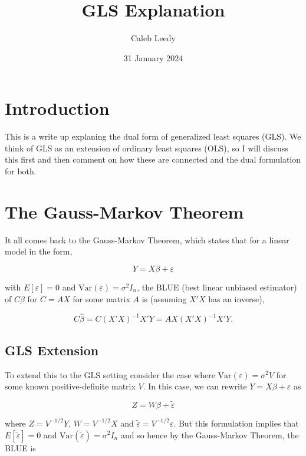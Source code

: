 \documentclass[
  letterpaper,
  DIV=11,
  numbers=noendperiod]{scrartcl}
\title{GLS Explanation}
\author{Caleb Leedy}
\date{31 January 2024}
\newcommand{\Var}{{\text{Var}}}
\begin{document}
\maketitle
\ifdefined\Shaded\renewenvironment{Shaded}{\begin{tcolorbox}[sharp corners, interior hidden, frame hidden, borderline west={3pt}{0pt}{shadecolor}, boxrule=0pt, enhanced, breakable]}{\end{tcolorbox}}\fi

\hypertarget{introduction}{%
\section{Introduction}\label{introduction}}

This is a write up explaning the dual form of generalized least squares
(GLS). We think of GLS as an extension of ordinary least squares (OLS),
so I will discuss this first and then comment on how these are connected
and the dual formulation for both.

\hypertarget{the-gauss-markov-theorem}{%
\section{The Gauss-Markov Theorem}\label{the-gauss-markov-theorem}}

It all comes back to the Gauss-Markov Theorem, which states that for a
linear model in the form,

\[ Y = X\beta + \varepsilon\]

with \(E[\varepsilon] = 0\) and \(\Var(\varepsilon) = \sigma^2 I_n\),
the BLUE (best linear unbiased estimator) of \(C\beta\) for \(C = AX\)
for some matrix \(A\) is (assuming \(X'X\) has an inverse),

\[ C\hat \beta = C(X'X)^{-1} X'Y = AX(X'X)^{-1}X'Y.\]

\hypertarget{gls-extension}{%
\subsection{GLS Extension}\label{gls-extension}}

To extend this to the GLS setting consider the case where
\(\Var(\varepsilon) = \sigma^2 V\) for some known positive-definite
matrix \(V\). In this case, we can rewrite \(Y = X\beta + \varepsilon\)
as

\[ Z = W\beta + \tilde \varepsilon\]

where \(Z = V^{-1/2} Y\), \(W = V^{-1/2}X\) and
\(\tilde \varepsilon = V^{-1/2} \varepsilon\). But this formulation
implies that \(E[\tilde \varepsilon] = 0\) and
\(\Var(\tilde \varepsilon) = \sigma^2 I_n\) and so hence by the
Gauss-Markov Theorem, the BLUE is
\end{document}
